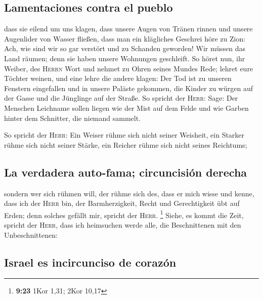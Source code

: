 \hypertarget{lamentaciones-contra-el-pueblo}{%
\subsection{Lamentaciones contra el
pueblo}\label{lamentaciones-contra-el-pueblo}}

 dass sie eilend um uns klagen, dass unsere Augen von
Tränen rinnen und unsere Augenlider von Wasser fließen, 
dass man ein klägliches Geschrei höre zu Zion: Ach, wie sind wir so gar
verstört und zu Schanden geworden! Wir müssen das Land räumen; denn sie
haben unsere Wohnungen geschleift.  So höret nun, ihr
Weiber, des \textsc{Herrn} Wort und nehmet zu Ohren seines Mundes Rede;
lehret eure Töchter weinen, und eine lehre die andere klagen:
 Der Tod ist zu unseren Fenstern eingefallen und in
unsere Paläste gekommen, die Kinder zu würgen auf der Gasse und die
Jünglinge auf der Straße.  So spricht der \textsc{Herr}:
Sage: Der Menschen Leichname sollen liegen wie der Mist auf dem Felde
und wie Garben hinter dem Schnitter, die niemand sammelt.

 So spricht der \textsc{Herr}: Ein Weiser rühme sich
nicht seiner Weisheit, ein Starker rühme sich nicht seiner Stärke, ein
Reicher rühme sich nicht seines Reichtums;

\hypertarget{la-verdadera-auto-fama-circuncisiuxf3n-derecha}{%
\subsection{La verdadera auto-fama; circuncisión
derecha}\label{la-verdadera-auto-fama-circuncisiuxf3n-derecha}}

 sondern wer sich rühmen will, der rühme sich des, dass
er mich wisse und kenne, dass ich der \textsc{Herr} bin, der
Barmherzigkeit, Recht und Gerechtigkeit übt auf Erden; denn solches
gefällt mir, spricht der \textsc{Herr}. \footnote{\textbf{9:23} 1Kor
  1,31; 2Kor 10,17}  Siehe, es kommt die Zeit, spricht
der \textsc{Herr}, dass ich heimsuchen werde alle, die Beschnittenen mit
den Unbeschnittenen:

\hypertarget{israel-es-incircunciso-de-corazuxf3n}{%
\subsection{Israel es incircunciso de
corazón}\label{israel-es-incircunciso-de-corazuxf3n}}

